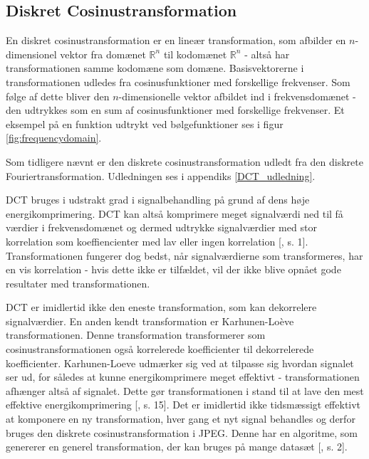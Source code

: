 \subsection{Diskret Cosinustransformation}\label{sec:DCT}
En diskret cosinustransformation er en lineær transformation, som afbilder en $n$-dimensionel vektor fra domænet $\mathbb{R}^n$ til kodomænet $\mathbb{R}^n$ - altså har transformationen samme kodomæne som domæne. Basisvektorerne i transformationen udledes fra cosinusfunktioner med forskellige frekvenser. Som følge af dette bliver den $n$-dimensionelle vektor afbildet ind i frekvensdomænet - den udtrykkes som en sum af cosinusfunktioner med forskellige frekvenser. Et eksempel på en funktion udtrykt ved bølgefunktioner ses i figur \vref{fig:frequencydomain}.

Som tidligere nævnt er den diskrete cosinustransformation udledt fra den diskrete Fouriertransformation. Udledningen ses i appendiks \vref{DCT_udledning}.

DCT bruges i udstrakt grad i signalbehandling på grund af dens høje energikomprimering. DCT kan altså komprimere meget signalværdi ned til få værdier i frekvensdomænet og dermed udtrykke signalværdier med stor korrelation som koeffiencienter med lav eller ingen korrelation [\citet{lokminglui_DCT}, s. 1]. Transformationen fungerer dog bedst, når signalværdierne som transformeres, har en vis korrelation - hvis dette ikke er tilfældet, vil der ikke blive opnået gode resultater med transformationen.

DCT er imidlertid ikke den eneste transformation, som kan dekorrelere signalværdier. En anden kendt transformation er Karhunen-Loève transformationen. Denne transformation transformerer som cosinustransformationen også korrelerede koefficienter til dekorrelerede koefficienter. Karhunen-Loeve udmærker sig ved at tilpasse sig hvordan signalet ser ud, for således at kunne energikomprimere meget effektivt - transformationen afhænger altså af signalet. Dette gør transformationen i stand til at lave den mest effektive energikomprimering [\citet{lokminglui_DCT}, s. 15]. Det er imidlertid ikke tidsmæssigt effektivt at komponere en ny transformation, hver gang et nyt signal behandles og derfor bruges den diskrete cosinustransformation i JPEG. Denne har en algoritme, som genererer en generel transformation, der kan bruges på mange datasæt [\citet{electronic_engineering}, s. 2].

